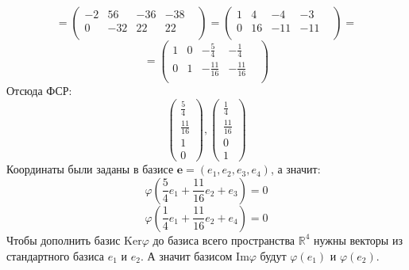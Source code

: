 \documentclass[a4paper,12pt]{article}
\begin{document}
\[
=
\begin{pmatrix}
-2 & 56 & -36 & -38 & \\
0 & -32 & 22 & 22 & \\
\end{pmatrix}
=
\begin{pmatrix}
1 & 4 & -4 & -3 & \\
0 & 16 & -11 & -11 & \\
\end{pmatrix}
=
\]
\[
=
\begin{pmatrix}
1 & 0 & -\frac{5}{4} & -\frac{1}{4} & \\
0 & 1 & -\frac{11}{16} & -\frac{11}{16} & \\
\end{pmatrix}
\]
Отсюда ФСР:
\[
\begin{pmatrix}
\frac{5}{4} \\ \frac{11}{16} \\ 1 \\ 0
\end{pmatrix}
, 
\begin{pmatrix}
\frac{1}{4} \\ \frac{11}{16} \\ 0 \\ 1
\end{pmatrix}
\]
Координаты были заданы в базисе $\mathbf{e} = (e_1, e_2, e_3, e_4)$, а значит:
\[
\varphi \left(\frac{5}{4} e_1 + \frac{11}{16}e_2 + e_3 \right) = 0
\]
\[
\varphi \left(\frac{1}{4} e_1 + \frac{11}{16} e_2 + e_4 \right) = 0
\]
Чтобы дополнить базис $\text{Ker} \varphi$ до базиса всего пространства $\mathbb{R}^4$ нужны векторы из стандартного базиса $e_1$ и $e_2$. А значит базисом $\text{Im} \varphi$ будут $\varphi(e_1)$ и $\varphi(e_2)$.
 
\end{document}
